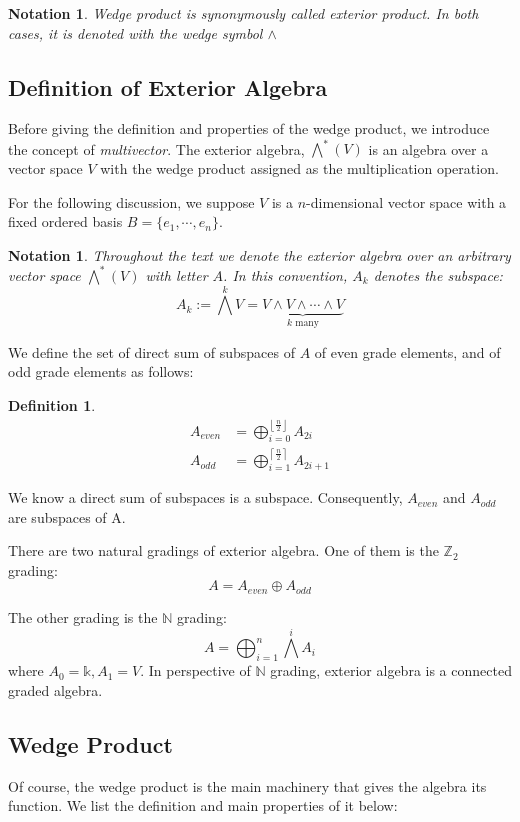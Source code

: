 \documentclass[12pt]{article}
\newtheorem{definition}[theorem]{Definition}
\newtheorem{notation}[theorem]{Notation}
\numberwithin{theorem}{section}
\numberwithin{equation}{theorem}
\newcommand{\kk}{\mathds{k}}
\begin{document}
\begin{notation}
    Wedge product is synonymously called \emph{exterior product}. In both cases, it is denoted with the wedge symbol $\wedge$
\end{notation}

\subsection{Definition of Exterior Algebra}
Before giving the definition and properties of the wedge product, we introduce the concept of \emph{multivector}. The exterior algebra, $\bigwedge^*(V)$ is an algebra over a vector space $V$ with the wedge product assigned as the multiplication operation.

For the following discussion, we suppose $V$ is a $n$-dimensional vector space with a fixed ordered basis $B = \{ e_1, \cdots, e_n \}$.

\begin{notation}
    Throughout the text we denote the exterior algebra over an arbitrary vector space $\bigwedge^*(V)$ with letter $A$.
    In this convention, $A_k$ denotes the subspace:
    $$A_k := \bigwedge^kV = \underbrace{V \wedge V \wedge \cdots \wedge V}_{k \text{ many}}$$
\end{notation}
We define the set of direct sum of subspaces of $A$ of even grade elements, and of odd grade elements as follows: 
\begin{definition}
    \begin{align*}
        A_{even} &= \bigoplus_{i = 0}^{\left\lfloor \frac{n}{2} \right\rfloor} A_{2i}\\
        A_{odd} &= \bigoplus_{i = 1}^{\left\lceil \frac{n}{2} \right\rceil} A_{2i+1}
    \end{align*}
\end{definition}
\noindent
We know a direct sum of subspaces is a subspace. Consequently, $A_{even}$ and $A_{odd}$ are subspaces of A. 

There are two natural gradings of exterior algebra. One of them is the $\mathbb{Z}_2$ grading:
$$A = A_{even} \oplus A_{odd}$$

The other grading is the $\mathbb{N}$ grading:
$$
A = \bigoplus_{i = 1}^n \bigwedge^i A_i
$$
where $A_0 = \kk, A_1 = V$. In perspective of $\mathbb{N}$ grading, exterior algebra is a connected graded algebra. 

\subsection{Wedge Product}
Of course, the wedge product is the main machinery that gives the algebra its function. We list the definition and main properties of it below:
\end{document}

